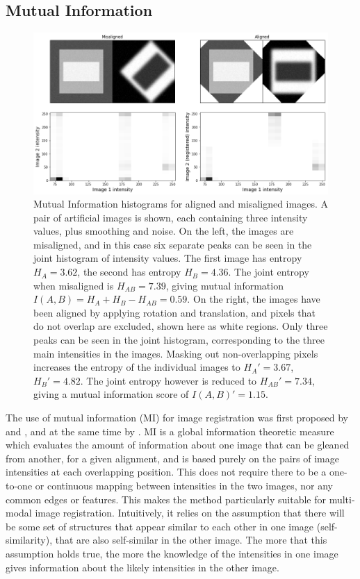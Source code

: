 \documentclass{report}
\begin{document}
\subsection{Mutual Information}
\begin{figure}
\centering
\includegraphics[width = 5 in]{MI_joint_histogram.png}
\caption{Mutual Information histograms for aligned and misaligned images. A pair of artificial images is shown, each containing three intensity values, plus smoothing and noise. On the left, the images are misaligned, and in this case six separate peaks can be seen in the joint histogram of intensity values. The first image has entropy $H_A=3.62$, the second has entropy $H_B=4.36$. The joint entropy when misaligned is $H_{AB}=7.39$, giving mutual information $I(A,B)=H_A+H_B-H_{AB}=0.59$. On the right, the images have been aligned by applying rotation and translation, and pixels that do not overlap are excluded, shown here as white regions. Only three peaks can be seen in the joint histogram, corresponding to the three main intensities in the images. Masking out non-overlapping pixels increases the entropy of the individual images to $H_A'=3.67$, $H_B'=4.82$. The joint entropy however is reduced to $H_{AB}'=7.34$, giving a mutual information score of $I(A,B)'=1.15$.}
\label{fig:MI_histogram}
\end{figure}

The use of mutual information (MI) for image registration was first proposed by \cite{wells1996multi} and \cite{viola1997alignment}, and at the same time by \cite{maes1997multimodality}. MI is a global information theoretic measure which evaluates the amount of information about one image that can be gleaned from another, for a given alignment, and is based purely on the pairs of image intensities at each overlapping position. This does not require there to be a one-to-one or continuous mapping between intensities in the two images, nor any common edges or features. This makes the method particularly suitable for multi-modal image registration. Intuitively, it relies on the assumption that there will be some set of structures that appear similar to each other in one image (self-similarity), that are also self-similar in the other image. The more that this assumption holds true, the more the knowledge of the intensities in one image gives information about the likely intensities in the other image.
\end{document}
